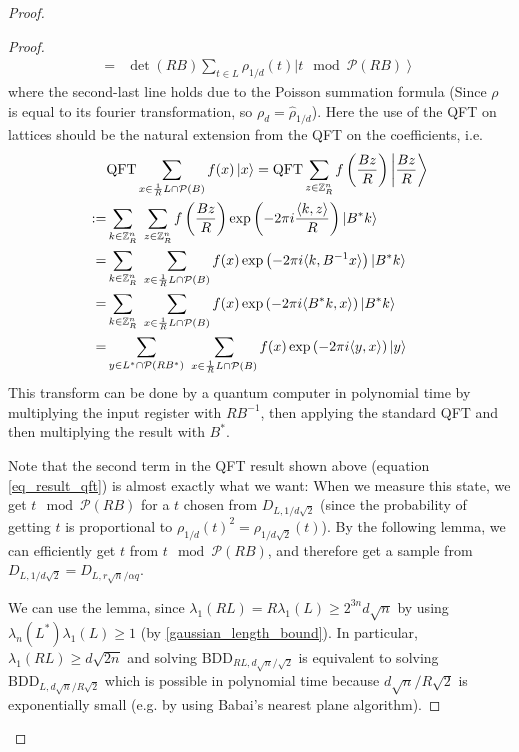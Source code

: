 \begin{proof}
\begin{proof}
\begin{equation}
\begin{split}
=& \det(RB) \sum_{t \in L} \rho_{1/d}(t) \left|t \mod \mathcal{P}(RB)\right\rangle \nonumber
\end{split}
\end{equation}
where the second-last line holds due to the Poisson summation formula (Since $\rho$ is equal to its fourier transformation, so $\rho_d = \hat\rho_{1/d}$). Here the use of the QFT on lattices should be the natural extension from the QFT on the coefficients, i.e.
\begin{equation}
\begin{split}
&\mathrm{QFT} \sum_{x \in \frac 1 R L \cap \mathcal{P}(B)} f(x) \left|x\right\rangle = \mathrm{QFT} \sum_{z \in \mathbb{Z}_R^n} f\left(\frac {Bz} R \right) \left|\frac {Bz} R \right\rangle \\
:=& \sum_{k \in \mathbb{Z}_R^n} \ \sum_{z \in \mathbb{Z}_R^n} f\left(\frac {Bz} R \right) \exp\left(-2\pi i\frac {\langle k, z \rangle} R\right) \left|B^* k\right\rangle \\
=& \sum_{k \in \mathbb{Z}_R^n} \ \sum_{x \in \frac 1 R L \cap \mathcal{P}(B)} f(x) \exp\left(-2\pi i \langle k, B^{-1}x \rangle \right) \left|B^* k\right\rangle \\
=& \sum_{k \in \mathbb{Z}_R^n} \ \sum_{x \in \frac 1 R L \cap \mathcal{P}(B)} f(x) \exp\left(-2\pi i \langle B^*k, x \rangle \right) \left|B^* k\right\rangle \\
=& \sum_{y \in L^* \cap \mathcal{P}(RB^*) } \ \sum_{x \in \frac 1 R L \cap \mathcal{P}(B)} f(x) \exp\left(-2\pi i \langle y, x \rangle \right) \left|y\right\rangle \nonumber
\end{split}
\end{equation}
This transform can be done by a quantum computer in polynomial time by multiplying the input register with $RB^{-1}$, then applying the standard QFT and then multiplying the result with $B^*$.

Note that the second term in the QFT result shown above (equation \ref{eq_result_qft}) is almost exactly what we want: When we measure this state, we get $t \mod \mathcal{P}(RB)$ for a $t$ chosen from $D_{L, 1/d\sqrt{2}}$ (since the probability of getting $t$ is proportional to $\rho_{1/d}(t)^2 = \rho_{1/d\sqrt{2}}(t)$). By the following lemma, we can efficiently get $t$ from $t \mod \mathcal{P}(RB)$, and therefore get a sample from $D_{L, 1/d\sqrt{2}} = D_{L, r\sqrt{n}/\alpha q}$. 

We can use the lemma, since $\lambda_1(RL) = R\lambda_1(L) \geq 2^{3n}d\sqrt{n}$ by using $\lambda_n(L^*)\lambda_1(L) \geq 1$ (by \ref{gaussian_length_bound}). In particular, $\lambda_1(RL) \geq d\sqrt{2n}$ and solving $\mathrm{BDD}_{RL, d\sqrt{n}/\sqrt{2}}$ is equivalent to solving $\mathrm{BDD}_{L, d\sqrt{n}/R\sqrt{2}}$ which is possible in polynomial time because $d\sqrt{n}/R\sqrt{2}$ is exponentially small (e.g. by using Babai's nearest plane algorithm).


\end{proof}
\end{proof}
